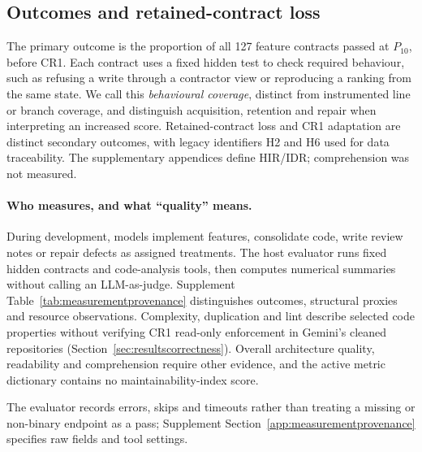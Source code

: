 \subsection{Outcomes and retained-contract loss}\label{sec:decaymeasurement}

The primary outcome is the proportion of all 127 feature contracts passed at $P_{10}$, before CR1. Each contract uses a fixed hidden test to check required behaviour, such as refusing a write through a contractor view or reproducing a ranking from the same state.
We call this \emph{behavioural coverage}, distinct from instrumented line or
branch coverage, and distinguish acquisition, retention and repair when
interpreting an increased score.
Retained-contract loss and CR1 adaptation are distinct secondary outcomes,
with legacy identifiers H2 and H6 used for data traceability.
The supplementary appendices define HIR/IDR; comprehension was not measured.

\paragraph{Who measures, and what ``quality'' means.}
During development, models implement features, consolidate code, write
review notes or repair defects as assigned treatments.
The host evaluator runs fixed hidden contracts and code-analysis tools,
then computes numerical summaries without calling an LLM-as-judge.
Supplement Table~\ref{tab:measurementprovenance} distinguishes outcomes, structural proxies and resource observations.
Complexity, duplication and lint describe selected code properties without verifying CR1 read-only enforcement in Gemini's cleaned repositories
(Section~\ref{sec:resultscorrectness}). Overall architecture quality, readability and comprehension require other evidence, and the active metric dictionary contains no maintainability-index score.



The evaluator records errors, skips and timeouts rather than treating a
missing or non-binary endpoint as a pass; Supplement
Section~\ref{app:measurementprovenance} specifies raw fields and tool settings.

